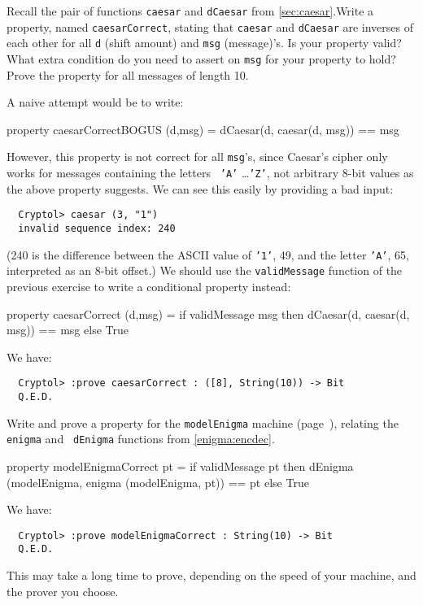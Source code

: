 \begin{Exercise}\label{ex:cond:3}
  Recall the pair of functions {\tt caesar} and {\tt dCaesar} from
  \autoref{sec:caesar}.\indCaesarscipher Write a property, named
  {\tt caesarCorrect}, stating that {\tt caesar} and {\tt dCaesar} are
  inverses of each other for all {\tt d} (shift amount) and {\tt msg}
  (message)'s. Is your property valid? What extra condition do you
  need to assert on {\tt msg} for your property to hold? Prove the
  property for all messages of length 10.
\end{Exercise}
\begin{Answer}
  A naive attempt would be to write:
\begin{code}
  property caesarCorrectBOGUS (d,msg) =
           dCaesar(d, caesar(d, msg)) == msg
\end{code}
However, this property is not correct for all {\tt msg}'s, since
Caesar's cipher only works for messages containing the letters {\tt
  'A'} \ldots {\tt 'Z'}, not arbitrary 8-bit values as the above
property suggests. We can see this easily by providing a bad input:
\begin{Verbatim}
  Cryptol> caesar (3, "1")
  invalid sequence index: 240
\end{Verbatim}
(240 is the difference between the ASCII value of {\tt '1'}, 49, and
the letter {\tt 'A'}, 65, interpreted as an 8-bit offset.) We should
use the {\tt validMessage} function of the previous exercise to write
a conditional property instead:
\begin{code}
  property caesarCorrect (d,msg) = if validMessage msg
                                   then dCaesar(d, caesar(d, msg)) == msg
                                   else True
\end{code}
We have:
\begin{Verbatim}
  Cryptol> :prove caesarCorrect : ([8], String(10)) -> Bit
  Q.E.D.
\end{Verbatim}
\end{Answer}

\begin{Exercise}\label{ex:cond:4}
  Write and prove a property for the {\tt modelEnigma} machine
  (page~\pageref{def:modelEnigma}), relating the {\tt enigma} and {\tt
    dEnigma} functions from \autoref{enigma:encdec}.
\end{Exercise}
\begin{Answer}
\begin{code}
  property modelEnigmaCorrect pt =
       if validMessage pt
       then dEnigma (modelEnigma, enigma (modelEnigma, pt)) == pt
       else True
\end{code}
We have:
\begin{Verbatim}
  Cryptol> :prove modelEnigmaCorrect : String(10) -> Bit
  Q.E.D.
\end{Verbatim}
\end{Answer}
This may take a long time to prove, depending on the speed of your
machine, and the prover you choose.

